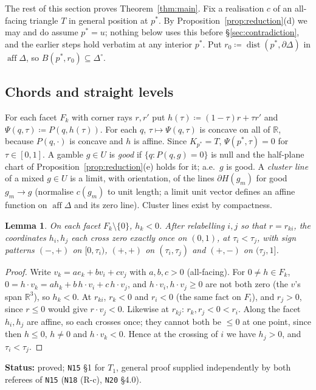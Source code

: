 \documentclass[11pt]{article}
\newtheorem{lemma}[theorem]{Lemma}
\theoremstyle{definition}
\theoremstyle{remark}
\newcommand{\R}{\mathbb R}
\newcommand{\Di}{\Delta^{\circ}}
\newcommand{\aff}{\operatorname{aff}}
\newcommand{\src}[1]{\texttt{#1}}
\newcommand{\status}[1]{\par\smallskip\noindent\textbf{Status:} #1\par\smallskip}
\begin{document}
The rest of this section proves Theorem~\ref{thm:main}. Fix a realisation $c$ of an all-facing triangle $T$ in general position at $p^*$. By Proposition~\ref{prop:reduction}(d) we may and do assume $p^*=u$; nothing below uses this before \S\ref{sec:contradiction}, and the earlier steps hold verbatim at any interior $p^*$. Put $r_0\coloneqq\operatorname{dist}(p^*,\partial\Delta)$ in $\aff\Delta$, so $B(p^*,r_0)\subseteq\Di$.

\subsection{Chords and straight levels}

For each facet $F_k$ with corner rays $r,r'$ put $h(\tau)\coloneqq(1-\tau)r+\tau r'$ and $\Psi(q,\tau)\coloneqq P(q,h(\tau))$. For each $q$, $\tau\mapsto\Psi(q,\tau)$ is concave on all of $\R$, because $P(q,\cdot)$ is concave and $h$ is affine. Since $K_{p^*}=T$, $\Psi(p^*,\tau)=0$ for $\tau\in[0,1]$. A gamble $g\in U$ is \emph{good} if $\{q:P(q,g)=0\}$ is null and the half-plane chart of Proposition~\ref{prop:reduction}(e) holds for it; a.e.\ $g$ is good. A \emph{cluster line} of a mixed $g\in U$ is a limit, with orientation, of the lines $\partial H(g_m)$ for good $g_m\to g$ (normalise $c(g_m)$ to unit length; a limit unit vector defines an affine function on $\aff\Delta$ and its zero line). Cluster lines exist by compactness.

\begin{lemma}\label{lem:signs}
On each facet $F_k\setminus\{0\}$, $h_k<0$. After relabelling $i,j$ so that $r=r_{ki}$, the coordinates $h_i,h_j$ each cross zero exactly once on $(0,1)$, at $\tau_i<\tau_j$, with sign patterns $(-,+)$ on $[0,\tau_i)$, $(+,+)$ on $(\tau_i,\tau_j)$ and $(+,-)$ on $(\tau_j,1]$.
\end{lemma}
\begin{proof}
Write $v_k=ae_k+bv_i+cv_j$ with $a,b,c>0$ (all-facing). For $0\ne h\in F_k$, $0=h\cdot v_k=ah_k+b\,h\cdot v_i+c\,h\cdot v_j$, and $h\cdot v_i,h\cdot v_j\ge0$ are not both zero (the $v$'s span $\R^3$), so $h_k<0$. At $r_{ki}$, $r_k<0$ and $r_i<0$ (the same fact on $F_i$), and $r_j>0$, since $r\le0$ would give $r\cdot v_j<0$. Likewise at $r_{kj}$: $r_k,r_j<0<r_i$. Along the facet $h_i,h_j$ are affine, so each crosses once; they cannot both be $\le0$ at one point, since then $h\le0$, $h\ne0$ and $h\cdot v_k<0$. Hence at the crossing of $i$ we have $h_j>0$, and $\tau_i<\tau_j$.
\end{proof}
\status{proved; \src{N15} \S1 for $T_1$, general proof supplied independently by both referees of \src{N15} (\src{N18} (R-c), \src{N20} \S4.0).}
\end{document}
